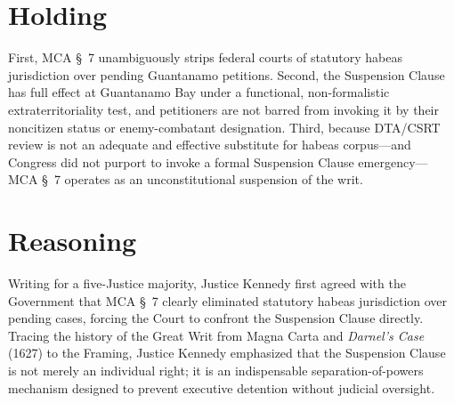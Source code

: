 \documentclass[12pt]{article}
\begin{document}
\section{Holding}
First, MCA \S~7 unambiguously strips federal courts of statutory habeas jurisdiction over pending Guantanamo petitions. Second, the Suspension Clause has full effect at Guantanamo Bay under a functional, non-formalistic extraterritoriality test, and petitioners are not barred from invoking it by their noncitizen status or enemy-combatant designation. Third, because DTA/CSRT review is not an adequate and effective substitute for habeas corpus---and Congress did not purport to invoke a formal Suspension Clause emergency---MCA \S~7 operates as an unconstitutional suspension of the writ.

\section{Reasoning}
Writing for a five-Justice majority, Justice Kennedy first agreed with the Government that MCA \S~7 clearly eliminated statutory habeas jurisdiction over pending cases, forcing the Court to confront the Suspension Clause directly. Tracing the history of the Great Writ from Magna Carta and \textit{Darnel's Case} (1627) to the Framing, Justice Kennedy emphasized that the Suspension Clause is not merely an individual right; it is an indispensable separation-of-powers mechanism designed to prevent executive detention without judicial oversight.
\end{document}
